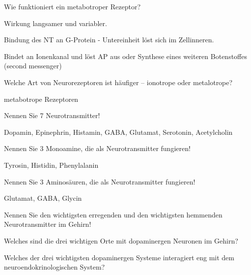 \documentclass[10pt, a4paper]{exam}
\begin{document}
\begin{questions}
  \question Wie funktioniert ein metabotroper Rezeptor?
  \begin{solution}
    \begin{itemize*}
      \item Wirkung langsamer und variabler.
      \item Bindung des NT an G-Protein - Untereinheit löst sich im Zellinneren.
      \item Bindet an Ionenkanal und löst AP aus oder Synthese eines weiteren Botenstoffes (second messenger)
    \end{itemize*}
  \end{solution}

  \question Welche Art von Neurorezeptoren ist häufiger – ionotrope oder metalotrope?
  \begin{solution}
    metabotrope Rezeptoren
  \end{solution}

  \question Nennen Sie 7 Neurotransmitter!
  \begin{solution}
    Dopamin, Epinephrin, Histamin, GABA, Glutamat, Serotonin, Acetylcholin
  \end{solution}

  \question Nennen Sie 3 Monoamine, die als Neurotransmitter fungieren!
  \begin{solution}
    Tyrosin, Histidin, Phenylalanin
  \end{solution}

  \question Nennen Sie 3 Aminosäuren, die als Neurotransmitter fungieren!
  \begin{solution}
    Glutamat, GABA, Glycin
  \end{solution}

  \question Nennen Sie den wichtigsten erregenden und den wichtigsten hemmenden Neurotransmitter im Gehirn!
  \begin{solution}

  \end{solution}

  \question Welches sind die drei wichtigen Orte mit dopaminergen Neuronen im Gehirn?
  \begin{solution}

  \end{solution}

  \question Welches der drei wichtigsten dopaminergen Systeme interagiert eng mit dem neuroendokrinologischen System?
  \begin{solution}

  \end{solution}


\end{questions}
\end{document}
